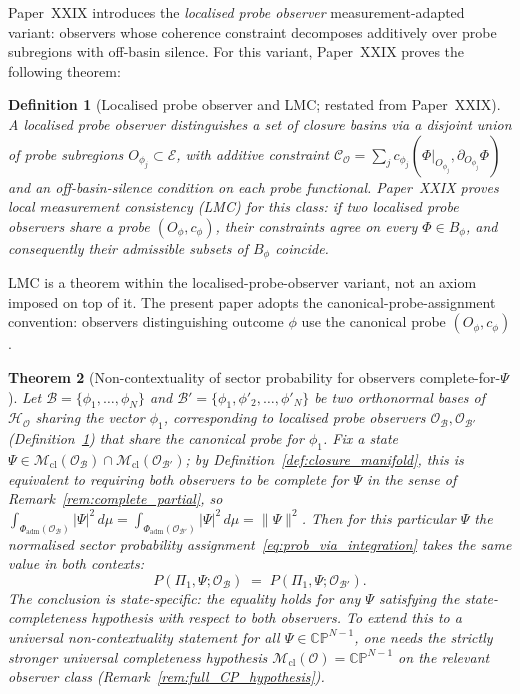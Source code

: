 \documentclass[12pt]{article}
\newtheorem{theorem}{Theorem}
\newtheorem{definition}[theorem]{Definition}
\newcommand{\Ecal}{\mathcal{E}}
\newcommand{\Ocal}{\mathcal{O}}
\newcommand{\Ccal}{\mathcal{C}}
\newcommand{\Hcal}{\mathcal{H}}
\newcommand{\Mcl}{\mathcal{M}_{\mathrm{cl}}}
\begin{document}
Paper~XXIX introduces the \emph{localised probe observer} measurement-adapted variant: observers whose coherence constraint decomposes additively over probe subregions with off-basin silence. For this variant, Paper~XXIX proves the following theorem:

\begin{definition}[Localised probe observer and LMC; restated from Paper~XXIX]\label{def:lmc}
A \emph{localised probe observer} distinguishes a set of closure basins via a disjoint union of probe subregions $O_{\phi_j} \subset \Ecal$, with additive constraint $\Ccal_\Ocal = \sum_j c_{\phi_j}(\Phi|_{O_{\phi_j}}, \partial_{O_{\phi_j}}\Phi)$ and an off-basin-silence condition on each probe functional. Paper~XXIX proves \emph{local measurement consistency} (LMC) for this class: if two localised probe observers share a probe $(O_\phi, c_\phi)$, their constraints agree on every $\Phi \in B_\phi$, and consequently their admissible subsets of $B_\phi$ coincide.
\end{definition}

LMC is a theorem within the localised-probe-observer variant, not an axiom imposed on top of it. The present paper adopts the canonical-probe-assignment convention: observers distinguishing outcome $\phi$ use the canonical probe $(O_\phi, c_\phi)$.

\begin{theorem}[Non-contextuality of sector probability for observers complete-for-$\Psi$]\label{thm:noncontextuality}
Let $\mathcal{B} = \{\phi_1, \ldots, \phi_N\}$ and $\mathcal{B}' = \{\phi_1, \phi'_2, \ldots, \phi'_N\}$ be two orthonormal bases of $\Hcal_\Ocal$ sharing the vector $\phi_1$, corresponding to localised probe observers $\Ocal_{\mathcal{B}}, \Ocal_{\mathcal{B}'}$ (Definition~\ref{def:lmc}) that share the canonical probe for $\phi_1$. Fix a state $\Psi \in \Mcl(\Ocal_\mathcal{B}) \cap \Mcl(\Ocal_{\mathcal{B}'})$; by Definition~\ref{def:closure_manifold}, this is equivalent to requiring both observers to be complete for $\Psi$ in the sense of Remark~\ref{rem:complete_partial}, so $\int_{\Phi_{\mathrm{adm}}(\Ocal_\mathcal{B})}|\Psi|^2 \, d\mu = \int_{\Phi_{\mathrm{adm}}(\Ocal_{\mathcal{B}'})}|\Psi|^2 \, d\mu = \|\Psi\|^2$. Then for this particular $\Psi$ the normalised sector probability assignment~\eqref{eq:prob_via_integration} takes the same value in both contexts:
\begin{equation}\label{eq:noncontextual}
    P(\Pi_1, \Psi; \Ocal_{\mathcal{B}}) \;=\; P(\Pi_1, \Psi; \Ocal_{\mathcal{B}'}).
\end{equation}
The conclusion is state-specific: the equality holds for any $\Psi$ satisfying the state-completeness hypothesis with respect to both observers. To extend this to a universal non-contextuality statement for all $\Psi \in \mathbb{CP}^{N-1}$, one needs the strictly stronger \emph{universal completeness} hypothesis $\Mcl(\Ocal) = \mathbb{CP}^{N-1}$ on the relevant observer class (Remark~\ref{rem:full_CP_hypothesis}).
\end{theorem}
\end{document}
